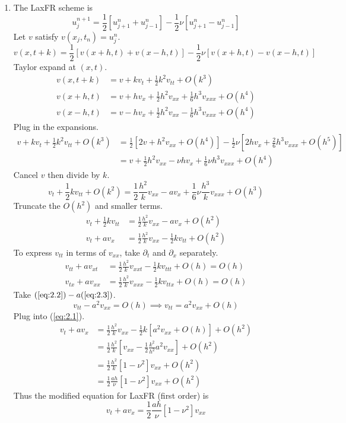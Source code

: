\documentclass{article}
\newcommand{\sbr}[1]{\left[#1\right]}
\newcommand{\imp}{\implies}
\newcommand{\ptl}{\partial}
\begin{document}
\begin{enumerate}[label=(\alph*)]
	
\item The LaxFR scheme is
$$u_j^{n+1} = \frac12[u_{j+1}^n + u_{j-1}^n] - \frac12\nu[u_{j+1}^n - u_{j-1}^n]$$
Let $v$ satisfy $v(x_j,t_n)=u_j^n$.
$$v(x,t+k) = \frac12[v(x+h,t) + v(x-h,t)] - \frac12\nu[v(x+h,t) - v(x-h,t)]$$
Taylor expand at $(x,t)$.
\begin{align*}
	v(x,t+k) &= v + kv_t + \frac12k^2v_{tt} + O(k^3)\\
	v(x+h,t) &= v + hv_x + \frac12h^2v_{xx} + \frac16h^3v_{xxx} + O(h^4)\\
	v(x-h,t) &= v - hv_x + \frac12h^2v_{xx} - \frac16h^3v_{xxx} + O(h^4)
\end{align*}
Plug in the expansions.
\begin{align*}
	v + kv_t + \frac12k^2v_{tt} + O(k^3) &= \frac12[2v + h^2v_{xx} + O(h^4)] - \frac12\nu\sbr{2hv_x + \frac26h^3v_{xxx} + O(h^5)}\\
	&= v + \frac12h^2v_{xx} - \nu hv_x + \frac16\nu h^3v_{xxx} + O(h^4)
\end{align*}
Cancel $v$ then divide by $k$.
$$v_t + \frac12kv_{tt} + O(k^2) = \frac12\frac{h^2}{k}v_{xx} - av_x + \frac16\nu \frac{h^3}{k}v_{xxx} + O(h^3)$$
Truncate the $O(h^2)$ and smaller terms.
\begin{align}
	v_t + \frac12kv_{tt} &= \frac12\frac{h^2}{k}v_{xx} - av_x + O(h^2) \nonumber\\
	v_t + av_x &= \frac12\frac{h^2}{k}v_{xx} - \frac12kv_{tt} + O(h^2) \label{eq:2.1}
\end{align}
To express $v_{tt}$ in terms of $v_{xx}$, take $\ptl_t$ and $\ptl_x$ separately.
\begin{align}
	v_{tt} + av_{xt} &= \frac12\frac{h^2}{k}v_{xxt} - \frac12kv_{ttt} + O(h) = O(h) \label{eq:2.2}\\
	v_{tx} + av_{xx} &= \frac12\frac{h^2}{k}v_{xxx} - \frac12kv_{ttx} + O(h) = O(h) \label{eq:2.3}
\end{align}
Take $(\ref{eq:2.2})-a(\ref{eq:2.3})$.
$$v_{tt} - a^2v_{xx} = O(h)
\imp v_{tt} = a^2v_{xx} + O(h)$$
Plug into (\ref{eq:2.1}).
\begin{align*}
	v_t + av_x &= \frac12\frac{h^2}{k}v_{xx} - \frac12k[a^2v_{xx} + O(h)] + O(h^2)\\
	&= \frac12\frac{h^2}{k}\sbr{v_{xx} - \frac12\frac{k^2}{h^2}a^2v_{xx}} + O(h^2)\\
	&= \frac12\frac{h^2}{k}[1-\nu^2]v_{xx} + O(h^2)\\
	&= \frac12\frac{ah}{\nu}[1-\nu^2]v_{xx} + O(h^2)
\end{align*}
Thus the modified equation for LaxFR (first order) is
$$\boxed{v_t + av_x = \frac12\frac{ah}{\nu}[1-\nu^2]v_{xx}}$$



\end{enumerate}
\end{document}
